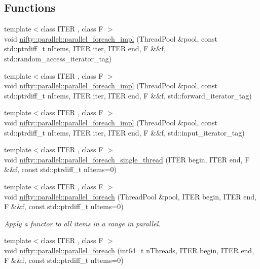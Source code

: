 \subsection*{Functions}
\begin{DoxyCompactItemize}
\item 
{\footnotesize template$<$class I\+T\+E\+R , class F $>$ }\\void \hyperlink{group__ParallelProcessing_ga7604490d8cf7a5b53de4477c866c8b86}{nifty\+::parallel\+::parallel\+\_\+foreach\+\_\+impl} (Thread\+Pool \&pool, const std\+::ptrdiff\+\_\+t n\+Items, I\+T\+E\+R iter, I\+T\+E\+R end, F \&\&f, std\+::random\+\_\+access\+\_\+iterator\+\_\+tag)
\item 
{\footnotesize template$<$class I\+T\+E\+R , class F $>$ }\\void \hyperlink{group__ParallelProcessing_gab81648beb53aff67df1822f993b49ad1}{nifty\+::parallel\+::parallel\+\_\+foreach\+\_\+impl} (Thread\+Pool \&pool, const std\+::ptrdiff\+\_\+t n\+Items, I\+T\+E\+R iter, I\+T\+E\+R end, F \&\&f, std\+::forward\+\_\+iterator\+\_\+tag)
\item 
{\footnotesize template$<$class I\+T\+E\+R , class F $>$ }\\void \hyperlink{group__ParallelProcessing_ga402d9e45f8edf065e6775e76a447f72e}{nifty\+::parallel\+::parallel\+\_\+foreach\+\_\+impl} (Thread\+Pool \&pool, const std\+::ptrdiff\+\_\+t n\+Items, I\+T\+E\+R iter, I\+T\+E\+R end, F \&\&f, std\+::input\+\_\+iterator\+\_\+tag)
\item 
{\footnotesize template$<$class I\+T\+E\+R , class F $>$ }\\void \hyperlink{group__ParallelProcessing_ga53b7128ccb1cf52e5646440337ce4ece}{nifty\+::parallel\+::parallel\+\_\+foreach\+\_\+single\+\_\+thread} (I\+T\+E\+R begin, I\+T\+E\+R end, F \&\&f, const std\+::ptrdiff\+\_\+t n\+Items=0)
\item 
{\footnotesize template$<$class I\+T\+E\+R , class F $>$ }\\void \hyperlink{group__ParallelProcessing_ga505ac3d12ecde87341bce7b6f1027c88}{nifty\+::parallel\+::parallel\+\_\+foreach} (Thread\+Pool \&pool, I\+T\+E\+R begin, I\+T\+E\+R end, F \&\&f, const std\+::ptrdiff\+\_\+t n\+Items=0)
\begin{DoxyCompactList}\small\item\em Apply a functor to all items in a range in parallel. \end{DoxyCompactList}\item 
{\footnotesize template$<$class I\+T\+E\+R , class F $>$ }\\void \hyperlink{group__ParallelProcessing_gae081bc77f03a070b9fe0f97966949f58}{nifty\+::parallel\+::parallel\+\_\+foreach} (int64\+\_\+t n\+Threads, I\+T\+E\+R begin, I\+T\+E\+R end, F \&\&f, const std\+::ptrdiff\+\_\+t n\+Items=0)

\end{DoxyCompactItemize}
